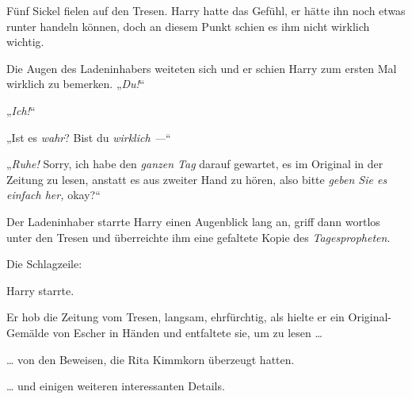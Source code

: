Fünf Sickel fielen auf den Tresen. Harry hatte das Gefühl, er hätte ihn noch etwas runter handeln können, doch an diesem Punkt schien es ihm nicht wirklich wichtig.

Die Augen des Ladeninhabers weiteten sich und er schien Harry zum ersten Mal wirklich zu bemerken.
„\emph{Du!}“

„\emph{Ich!}“

„Ist es \emph{wahr}? Bist du \emph{wirklich —}“

„\emph{Ruhe!} Sorry, ich habe den \emph{ganzen Tag} darauf gewartet, es im Original in der Zeitung zu lesen, anstatt es aus zweiter Hand zu hören, also bitte \emph{geben Sie es einfach her,} okay?“

Der Ladeninhaber starrte Harry einen Augenblick lang an, griff dann wortlos unter den Tresen und überreichte ihm eine gefaltete Kopie des \emph{Tagespropheten}.

Die Schlagzeile:


Harry starrte.

Er hob die Zeitung vom Tresen, langsam, ehrfürchtig, als hielte er ein Original-Gemälde von Escher in Händen und entfaltete sie, um zu lesen …

… von den Beweisen, die Rita Kimmkorn überzeugt hatten.

… und einigen weiteren interessanten Details.

